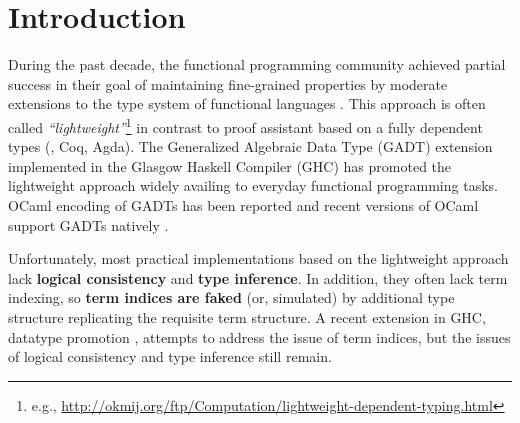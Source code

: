 \section{Introduction}
During the past decade, the functional programming community achieved
partial success in their goal of maintaining fine-grained properties
by moderate extensions to the type system of functional languages
\cite{CheHin03,CheHin02,Xi03}.
This approach is often called \emph{``lightweight''}\footnote{e.g.,
  \url{http://okmij.org/ftp/Computation/lightweight-dependent-typing.html} }
in contrast to proof assistant based on a fully dependent types
(\eg, Coq, Agda).
The Generalized Algebraic Data Type (GADT) extension implemented
in the Glasgow Haskell Compiler (GHC) has promoted the lightweight approach
widely availing to everyday functional programming tasks.
OCaml encoding of GADTs has been reported \cite{ManStu09}
and recent versions of OCaml support GADTs natively \cite{GarNor11}.

Unfortunately, most practical implementations based on
the lightweight approach lack \textbf{logical consistency} and
\textbf{type inference}. In addition,
they often lack term indexing, so \textbf{term indices are faked}
(or, simulated) by additional type structure replicating the requisite term
structure.
A recent extension in GHC, datatype promotion \cite{YorgeyWCJVM12},
attempts to address the issue of term indices, but the issues of
logical consistency and type inference still remain.

